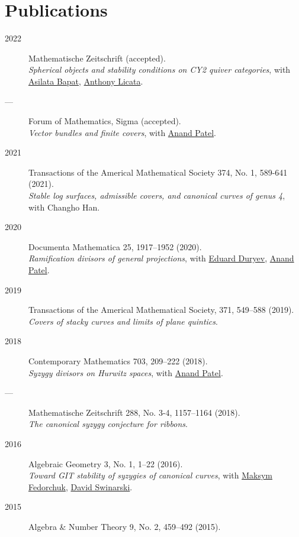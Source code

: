 \documentclass[11pt]{article}
\begin{document}
\section*{Publications}
\label{sec:orgb2a48fc}
\label{org79c14de}
\begin{description}
\item[{2022}] Mathematische Zeitschrift (accepted).\\
\emph{Spherical objects and stability conditions on CY2 quiver categories}, with \href{https://asilata.github.io/}{Asilata Bapat}, \href{https://maths-people.anu.edu.au/\~licatat/}{Anthony Licata}.
\item[{---}] Forum of Mathematics, Sigma (accepted).\\
\emph{Vector bundles and finite covers}, with \href{https://sites.google.com/view/anand-patel}{Anand Patel}.
\item[{2021}] Transactions of the Americal Mathematical Society 374, No. 1, 589-641 (2021).\\
\emph{Stable log surfaces, admissible covers, and canonical curves of genus 4}, with Changho Han.
\item[{2020}] Documenta Mathematica 25, 1917--1952 (2020).\\
\emph{Ramification divisors of general projections}, with \href{https://eduryev.weebly.com/}{Eduard Duryev}, \href{https://sites.google.com/view/anand-patel}{Anand Patel}.
\item[{2019}] Transactions of the Americal Mathematical Society, 371, 549--588 (2019).\\
\emph{Covers of stacky curves and limits of plane quintics}.
\item[{2018}] Contemporary Mathematics 703, 209--222 (2018).\\
\emph{Syzygy divisors on Hurwitz spaces}, with \href{https://sites.google.com/view/anand-patel}{Anand Patel}.
\item[{---}] Mathematische Zeitschrift 288, No. 3-4, 1157--1164 (2018).\\
\emph{The canonical syzygy conjecture for ribbons}.
\item[{2016}] Algebraic Geometry 3, No. 1, 1--22 (2016).\\
\emph{Toward GIT stability of syzygies of canonical curves}, with \href{https://www2.bc.edu/maksym-fedorchuk/}{Maksym Fedorchuk}, \href{http://faculty.fordham.edu/dswinarski/}{David Swinarski}.
\item[{2015}] Algebra \& Number Theory 9, No. 2, 459--492 (2015).\\

\end{description}
\end{document}

